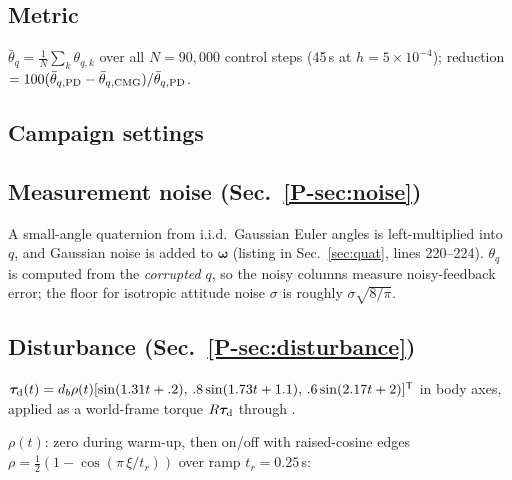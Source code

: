 \documentclass[11pt]{article}
\newcommand{\srcroot}{../../..}
\newcommand{\T}{^{\mathsf T}}
\newcommand{\PT}[1]{\ref{P-#1}}               %
\newcommand{\code}[1]{\texttt{\detokenize{#1}}}
\theoremstyle{remark}
\newcommand{\listing}[4]{%
  }
\begin{document}
\subsection{Metric}
$\bar\theta_q=\frac1N\sum_k\theta_{q,k}$ over all $N=90{,}000$ control steps (45\,s at $h=5\times10^{-4}$);
reduction $=100(\bar\theta_{q,\rm PD}-\bar\theta_{q,\rm CMG})/\bar\theta_{q,\rm PD}$.
\listing{experiments/nengo_nef_replication_2026-08-29/run_mujoco_nef.py}{346}{347}{per-step error}
\listing{experiments/nengo_nef_replication_2026-08-29/run_mujoco_nef.py}{549}{551}{summary statistics}

\subsection{Campaign settings}
\listing{experiments/nengo_nef_replication_2026-08-29/run_neuron_family_campaign.py}{50}{58}{matched runner arguments ($\beta$, $\eta$, $k_e$, $k_\omega^*$, $h$, scale)}

\subsection{Measurement noise (Sec.~\PT{sec:noise})}
A small-angle quaternion from i.i.d.\ Gaussian Euler angles is left-multiplied into $q$, and Gaussian noise
is added to $\bm\omega$ (listing in Sec.~\ref{sec:quat}, lines 220--224). $\theta_q$ is computed from the
\emph{corrupted} $q$, so the noisy columns measure noisy-feedback error; the floor for isotropic
attitude noise $\sigma$ is roughly $\sigma\sqrt{8/\pi}$.

\subsection{Disturbance (Sec.~\PT{sec:disturbance})}
$\bm\tau_{\rm d}(t)=d_b\rho(t)[\sin(1.31t+.2),\,.8\sin(1.73t+1.1),\,.6\sin(2.17t+2)]\T$ in body axes, applied
as a world-frame torque $R\bm\tau_{\rm d}$ through \code{xfrc_applied}.
\listing{experiments/nengo_nef_replication_2026-08-29/run_mujoco_nef.py}{299}{307}{body-frame multi-sine disturbance}
$\rho(t)$: zero during warm-up, then on/off with raised-cosine edges
$\rho=\frac12(1-\cos(\pi\,\xi/t_r))$ over ramp $t_r=0.25$\,s:
\listing{experiments/nengo_nef_replication_2026-08-29/run_mujoco_nef_perturbed.py}{88}{117}{intermittent envelope $\rho(t)$}

\end{document}
